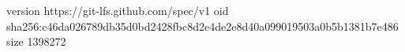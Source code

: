 version https://git-lfs.github.com/spec/v1
oid sha256:c46da026789db35d0bd2428fbc8d2e4de2e8d40a099019503a0b5b1381b7e486
size 1398272
